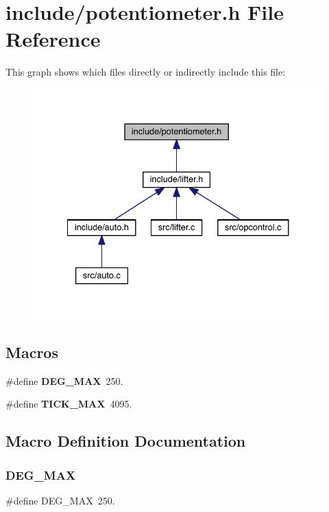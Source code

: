 \section{include/potentiometer.h File Reference}
\label{potentiometer_8h}
This graph shows which files directly or indirectly include this file\+:
\nopagebreak
\begin{figure}[H]
\begin{center}
\leavevmode
\includegraphics[width=334pt]{potentiometer_8h__dep__incl}
\end{center}
\end{figure}
\subsection*{Macros}
\begin{DoxyCompactItemize}
\item 
\#define \textbf{ D\+E\+G\+\_\+\+M\+AX}~250.
\item 
\#define \textbf{ T\+I\+C\+K\+\_\+\+M\+AX}~4095.
\end{DoxyCompactItemize}


\subsection{Macro Definition Documentation}
\mbox{\label{potentiometer_8h_ab77b81696cf83be632fca5f56b4c3595}} 
\subsubsection{D\+E\+G\+\_\+\+M\+AX}
{\footnotesize\ttfamily \#define D\+E\+G\+\_\+\+M\+AX~250.}



